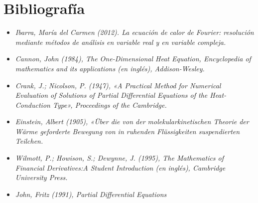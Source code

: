 \documentclass[12pt]{article}
\begin{document}



\section*{Bibliografía}
\begin{itemize}

\item \textit{Ibarra, María del Carmen (2012). La ecuación de calor de Fourier: resolución mediante métodos de análisis en variable real y en variable compleja.}

\item \textit{Cannon, John (1984), The One-Dimensional Heat Equation, Encyclopedia of mathematics and its applications (en inglés), Addison-Wesley.}

\item \textit{Crank, J.; Nicolson, P. (1947), «A Practical Method for Numerical Evaluation of Solutions of Partial Differential Equations of the Heat-Conduction Type», Proceedings of the Cambridge.}

\item \textit{Einstein, Albert (1905), «Über die von der molekularkinetischen Theorie der Wärme geforderte Bewegung von in ruhenden Flüssigkeiten suspendierten Teilchen.}

\item \textit{Wilmott, P.; Howison, S.; Dewynne, J. (1995), The Mathematics of Financial Derivatives:A Student Introduction (en inglés), Cambridge University Press.}

\item \textit{John, Fritz (1991), Partial Differential Equations}

\end{itemize}


\end{document}
